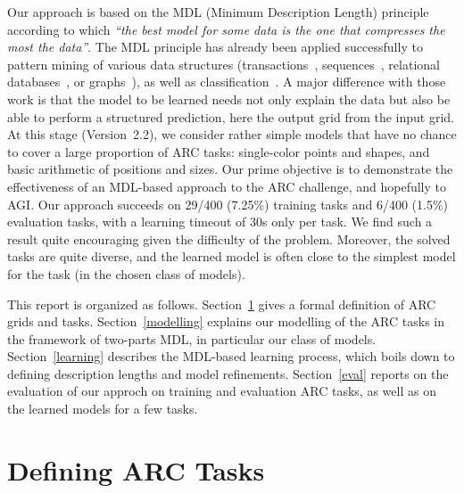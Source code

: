 \documentclass[a4paper]{llncs}
\newcommand{\HIDE}[1]{}
\begin{document}
Our approach is based on the MDL (Minimum Description Length)
principle~\cite{Rissanen1978,Grunwald2019} according to which {\em ``the best
model for some data is the one that compresses the most the data''}.
%
The MDL principle has already been applied successfully to pattern
mining of various data structures (transactions~\cite{KRIMP2011},
sequences~\cite{sqs2012}, relational databases~\cite{rdb_krimp2009},
or graphs~\cite{BarCelFer2020ida}), as well as
classification~\cite{ProLee2020}.
%
A major difference with those work is that the model to be learned
needs not only explain the data but also be able to perform a
structured prediction, here the output grid from the input grid.
%
At this stage (Version~2.2), we consider rather simple models that
have no chance to cover a large proportion of ARC tasks: single-color
points and shapes, and basic arithmetic of positions and sizes. Our
prime objective is to demonstrate the effectiveness of an MDL-based
approach to the ARC challenge, and hopefully to AGI. Our approach
succeeds on 29/400 (7.25\%) training tasks and 6/400 (1.5\%)
evaluation tasks, with a learning timeout of 30s only per task. We
find such a result quite encouraging given the difficulty of the
problem. Moreover, the solved tasks are quite diverse, and the
learned model is often close to the simplest model for the task (in
the chosen class of models).

This report is organized as follows. Section~\ref{arc} gives a formal
definition of ARC grids and tasks. \HIDE{Section~\ref{related} discusses
related work on artificial intelligence, in particular structured
prediction, AGI, or programming by demonstration; it also presents the
MDL principle and some of its applications to AI and knowledge
discovery.} Section~\ref{modelling} explains our modelling of the ARC
tasks in the framework of two-parts MDL, in particular our class of
models. Section~\ref{learning} describes the MDL-based learning
process, which boils down to defining description lengths and model
refinements. Section~\ref{eval} reports on the evaluation of our
approch on training and evaluation ARC tasks, as well as on the
learned models for a few tasks.


\section{Defining ARC Tasks}
\label{arc}
\end{document}
